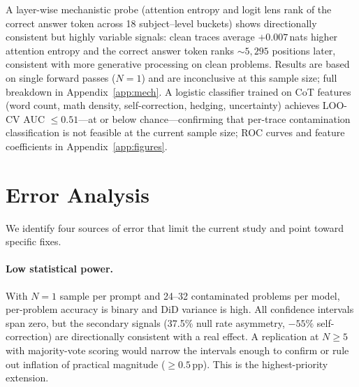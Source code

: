 \documentclass{article} %
\begin{document}
A layer-wise mechanistic probe (attention entropy and logit lens rank of the correct answer token across 18 subject--level buckets) shows directionally consistent but highly variable signals: clean traces average $+0.007$\,nats higher attention entropy and the correct answer token ranks ${\sim}5{,}295$ positions later, consistent with more generative processing on clean problems. Results are based on single forward passes ($N{=}1$) and are inconclusive at this sample size; full breakdown in Appendix~\ref{app:mech}. A logistic classifier trained on CoT features (word count, math density, self-correction, hedging, uncertainty) achieves LOO-CV AUC $\leq 0.51$---at or below chance---confirming that per-trace contamination classification is not feasible at the current sample size; ROC curves and feature coefficients in Appendix~\ref{app:figures}.

\section{Error Analysis}

We identify four sources of error that limit the current study and point toward specific fixes.

\paragraph{Low statistical power.}
With $N{=}1$ sample per prompt and 24--32 contaminated problems per model, per-problem accuracy is binary and DiD variance is high. All confidence intervals span zero, but the secondary signals (37.5\% null rate asymmetry, $-55\%$ self-correction) are directionally consistent with a real effect. A replication at $N{\geq}5$ with majority-vote scoring would narrow the intervals enough to confirm or rule out inflation of practical magnitude ($\geq 0.5$\,pp). This is the highest-priority extension.
\end{document}
